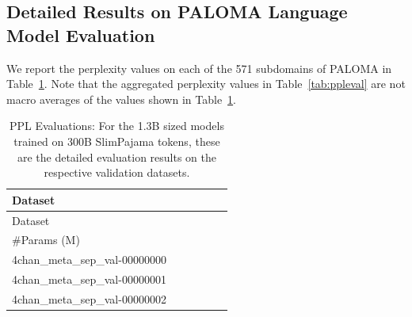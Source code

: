 \documentclass[dvipsnames]{article}
\begin{document}
\begin{appendix}
\section{Detailed Results on PALOMA Language Model Evaluation}
\label{sec:paloma}
We report the perplexity values on each of the 571 subdomains of PALOMA in Table~\ref{tab:spaj300B_ppl_evaluation_detail}.
Note that the aggregated perplexity values in Table~\ref{tab:ppleval} are not macro averages of the values shown in Table~\ref{tab:spaj300B_ppl_evaluation_detail}.
{\footnotesize
	\newlength{\mywidth}
	\setlength{\mywidth}{1.7cm}
	\addtolength{\mywidth}{-\tabcolsep}
	\setlength{\tabcolsep}{0pt}
\begin{longtable}{m{6cm}m{1.7cm}m{1.7cm}m{1.7cm}m{1.7cm}m{1.7cm}}
 \caption{PPL Evaluations: For the 1.3B sized models trained on 300B SlimPajama tokens, these are the detailed evaluation results on the respective validation datasets.
\label{tab:spaj300B_ppl_evaluation_detail}}\\
	Dataset & \makebox[\mywidth][c]{Llama} & \makebox[\mywidth][c]{Mamba} & \makebox[\mywidth][c]{RWKV-4} & \makebox[\mywidth][c]{xLSTM[7:1]} & \makebox[\mywidth][c]{xLSTM[1:0]} \\ \endfirsthead
	Dataset & \makebox[\mywidth][c]{Llama} & \makebox[\mywidth][c]{Mamba} & \makebox[\mywidth][c]{RWKV-4} & \makebox[\mywidth][c]{xLSTM[7:1]} & \makebox[\mywidth][c]{xLSTM[1:0]} \\ \endhead
	\hline
	\#Params (M) & \makebox[\mywidth][c]{1420} & \makebox[\mywidth][c]{1475} & \makebox[\mywidth][c]{1515} & \makebox[\mywidth][c]{1420} & \makebox[\mywidth][c]{1423} \\
	4chan\_meta\_sep\_val-00000000  & \colorbox[HTML]{91d183}{\makebox[\mywidth][c]{9.58}} & \colorbox[HTML]{c9e99b}{\makebox[\mywidth][c]{9.72}} & \colorbox[HTML]{ffffe5}{\makebox[\mywidth][c]{11.37}} & \colorbox[HTML]{77c578}{\makebox[\mywidth][c]{9.53}} & \colorbox[HTML]{84cb7d}{\makebox[\mywidth][c]{9.55}}\\
	4chan\_meta\_sep\_val-00000001  & \colorbox[HTML]{a0d789}{\makebox[\mywidth][c]{9.95}} & \colorbox[HTML]{ceeb9e}{\makebox[\mywidth][c]{10.06}} & \colorbox[HTML]{ffffe5}{\makebox[\mywidth][c]{11.57}} & \colorbox[HTML]{8bce80}{\makebox[\mywidth][c]{9.91}} & \colorbox[HTML]{77c578}{\makebox[\mywidth][c]{9.88}}\\
	4chan\_meta\_sep\_val-00000002  & \colorbox[HTML]{8ccf81}{\makebox[\mywidth][c]{9.42}} & \colorbox[HTML]{c3e698}{\makebox[\mywidth][c]{9.53}} & \colorbox[HTML]{ffffe5}{\makebox[\mywidth][c]{11.00}} & \colorbox[HTML]{7fc97b}{\makebox[\mywidth][c]{9.40}} & \colorbox[HTML]{77c578}{\makebox[\mywidth][c]{9.38}}\\

\end{longtable}}
\end{appendix}
\end{document}
